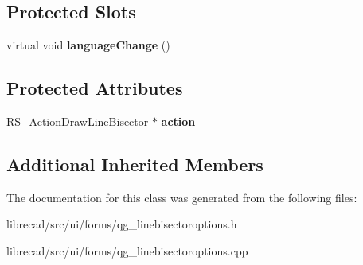 \subsection*{Protected Slots}
\begin{DoxyCompactItemize}
\item 
\hypertarget{classQG__LineBisectorOptions_a87310fe1a0107c8ab95fd717932fe5e7}{virtual void {\bfseries language\-Change} ()}\label{classQG__LineBisectorOptions_a87310fe1a0107c8ab95fd717932fe5e7}

\end{DoxyCompactItemize}
\subsection*{Protected Attributes}
\begin{DoxyCompactItemize}
\item 
\hypertarget{classQG__LineBisectorOptions_adfc47d547f819f10c8e386b2dec63eb8}{\hyperlink{classRS__ActionDrawLineBisector}{R\-S\-\_\-\-Action\-Draw\-Line\-Bisector} $\ast$ {\bfseries action}}\label{classQG__LineBisectorOptions_adfc47d547f819f10c8e386b2dec63eb8}

\end{DoxyCompactItemize}
\subsection*{Additional Inherited Members}


The documentation for this class was generated from the following files\-:\begin{DoxyCompactItemize}
\item 
librecad/src/ui/forms/qg\-\_\-linebisectoroptions.\-h\item 
librecad/src/ui/forms/qg\-\_\-linebisectoroptions.\-cpp\end{DoxyCompactItemize}
